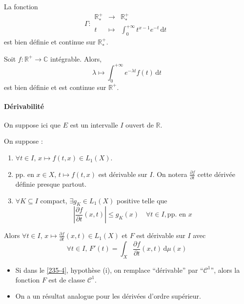 
	\begin{example}
		\label{235-3}
		La fonction
		\[ \Gamma :
		\begin{array}{ccc}
			\mathbb{R}^+_* &\rightarrow& \mathbb{R}^+_* \\
			t &\mapsto& \int_{0}^{+\infty} t^{x-1} e^{-t} \, \mathrm{d}t
		\end{array}
		\]
		est bien définie et continue sur $\mathbb{R}^+_*$.
	\end{example}


	\begin{example}
		Soit $f : \mathbb{R}^+ \rightarrow \mathbb{C}$ intégrable. Alors,
		\[ \lambda \mapsto \int_0^{+\infty} e^{-\lambda t} f(t) \, \mathrm{d}t \]
		est bien définie et est continue sur $\mathbb{R}^+$.
	\end{example}

	\paragraph{Dérivabilité}


	On suppose ici que $E$ est un intervalle $I$ ouvert de $\mathbb{R}$.

	\begin{theorem}
		\label{235-4}
		On suppose :
		\begin{enumerate}[label=(\roman*)]
			\item $\forall t \in I$, $x \mapsto f(t,x) \in L_1(X)$.
			\item pp. en $x \in X$, $t \mapsto f(t,x)$ est dérivable sur $I$. On notera $\frac{\partial f}{\partial t}$ cette dérivée définie presque partout.
			\item $\forall K \subseteq I$ compact, $\exists g_K \in L_1(X)$ positive telle que
			\[ \left| \frac{\partial f}{\partial t}(x,t) \right| \leq g_K(x) \quad \forall t \in I, \text{pp. en } x \]
		\end{enumerate}
		Alors $\forall t \in I$, $x \mapsto \frac{\partial f}{\partial t}(x, t) \in L_1(X)$ et $F$ est dérivable sur $I$ avec
		\[ \forall t \in I, \, F'(t) = \int_X \frac{\partial f}{\partial t}(x, t) \, \mathrm{d}\mu(x) \]
	\end{theorem}

	\begin{remark}
		\begin{itemize}
			\item Si dans le \cref{235-4}, hypothèse (i), on remplace ``dérivable'' par ``$\mathcal{C}^1$'', alors la fonction $F$ est de classe $\mathcal{C}^1$.
			\item On a un résultat analogue pour les dérivées d'ordre supérieur.
		\end{itemize}
	\end{remark}

